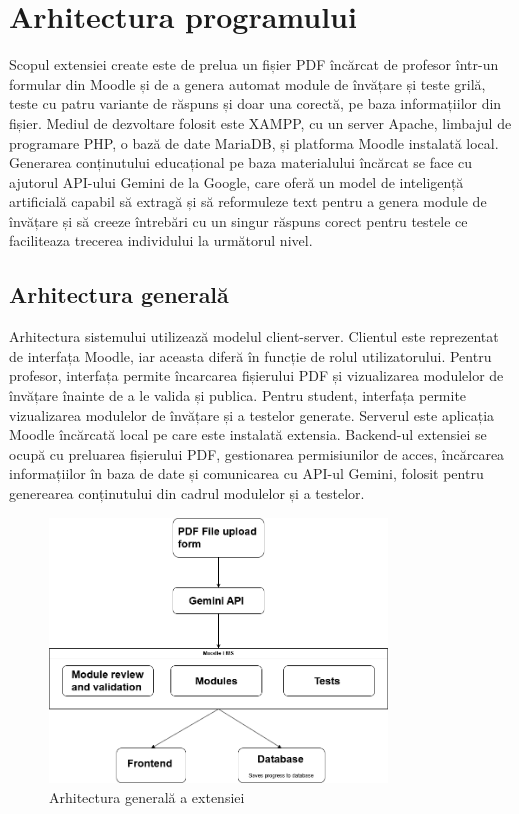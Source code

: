\chapter{Arhitectura programului}

Scopul extensiei create este de prelua un fișier PDF încărcat de profesor într-un formular din Moodle și de a genera automat module de învățare și teste grilă, teste cu patru variante de
răspuns și doar una corectă, pe baza informațiilor din fișier. Mediul de dezvoltare folosit este XAMPP, cu un server Apache, limbajul de programare PHP, o bază de date MariaDB, și
platforma Moodle instalată local. Generarea conținutului educațional pe baza materialului încărcat se face cu ajutorul API-ului Gemini de la Google, care oferă un model de inteligență 
artificială capabil să extragă și să reformuleze text pentru a genera module de învățare și să creeze întrebări cu un singur răspuns corect pentru testele ce faciliteaza trecerea individului 
la următorul nivel.  

\section{Arhitectura generală}

Arhitectura sistemului utilizează modelul client-server. Clientul este reprezentat de interfața Moodle, iar aceasta diferă în funcție de rolul utilizatorului. Pentru profesor, interfața 
permite încarcarea fișierului PDF și vizualizarea modulelor de învățare înainte de a le valida și publica. Pentru student, interfața permite vizualizarea modulelor de învățare și a testelor 
generate. Serverul este aplicația Moodle încărcată local pe care este instalată extensia. Backend-ul extensiei se ocupă cu preluarea fișierului PDF, gestionarea permisiunilor de acces, 
încărcarea informațiilor în baza de date și comunicarea cu API-ul Gemini, folosit pentru generearea conținutului din cadrul modulelor și a testelor.

\begin{figure}[ht]
    \centering
    \includegraphics[width=0.8\textwidth]{images/LicentaArchitectureDiagram.png}
    \caption{Arhitectura generală a extensiei}
    \label{fig:arch_diagram}
\end{figure}

